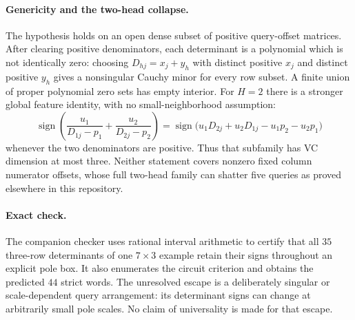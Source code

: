 \documentclass[11pt]{article}
\begin{document}
\paragraph{Genericity and the two-head collapse.}
The hypothesis holds on an open dense subset of positive query-offset
matrices. After clearing positive denominators, each determinant is a
polynomial which is not identically zero: choosing
$D_{hj}=x_j+y_h$ with distinct positive $x_j$ and distinct positive
$y_h$ gives a nonsingular Cauchy minor for every row subset. A finite
union of proper polynomial zero sets has empty interior.
For $H=2$ there is a stronger global feature identity, with no
small-neighborhood assumption:
\[
 \operatorname{sign}\left(\frac{u_1}{D_{1j}-p_1}
              +\frac{u_2}{D_{2j}-p_2}\right)
 =\operatorname{sign}\bigl(u_1D_{2j}+u_2D_{1j}
                      -u_1p_2-u_2p_1\bigr)
\]
whenever the two denominators are positive. Thus that subfamily has
VC dimension at most three. Neither statement covers nonzero fixed
column numerator offsets, whose full two-head family can shatter five
queries as proved elsewhere in this repository.

\paragraph{Exact check.}
The companion checker uses rational interval arithmetic to certify
that all $35$ three-row determinants of one $7\times3$ example retain
their signs throughout an explicit pole box. It also enumerates the
circuit criterion and obtains the predicted $44$ strict words.
The unresolved escape is a deliberately singular or scale-dependent
query arrangement: its determinant signs can change at arbitrarily
small pole scales. No claim of universality is made for that escape.
\end{document}
